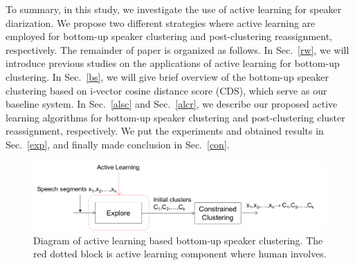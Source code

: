 \documentclass[journal,10pt]{IEEEtran}
\begin{document}
To summary, in this study, we investigate the use of active learning for speaker diarization. We propose two different strategies where active learning are employed for bottom-up speaker clustering and post-clustering reassignment, respectively. The remainder of paper is organized as follows. In Sec.~\ref{rw}, we will introduce previous studies on the applications of active learning for bottom-up clustering. In Sec.~\ref{bs}, we will give brief overview of the bottom-up speaker clustering based on i-vector cosine distance score (CDS), which serve as our baseline system.  In Sec.~\ref{alsc} and Sec.~\ref{alcr}, we describe our proposed active learning algorithms for bottom-up speaker clustering and post-clustering cluster reassignment, respectively. We put the experiments and obtained results in Sec.~\ref{exp}, and finally made conclusion in Sec.~\ref{con}.  

\begin{figure}
	\includegraphics[width=\linewidth]{figs/flow5}
	\caption{Diagram of active learning based bottom-up speaker clustering. The red dotted block is active learning component where human involves.}
	\label{fig:flow1}
\end{figure}
\end{document}
